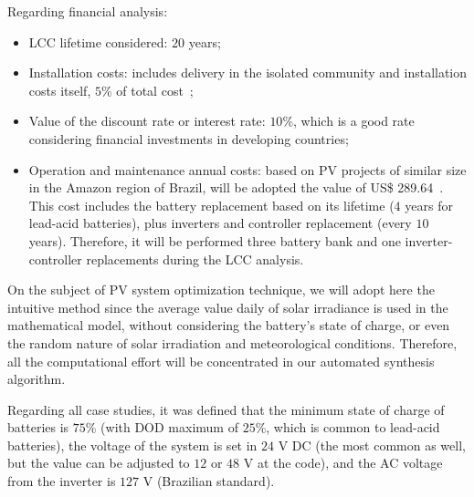\documentclass[journal]{IEEEtran}
\begin{document}
Regarding financial analysis:
\begin{itemize}
	\item LCC lifetime considered: $20$ years;
	\item Installation costs: includes delivery in the isolated community and installation costs itself, $5$\% of total cost~\cite{Agrener2013};
	\item Value of the discount rate or interest rate: $10$\%, which is a good rate considering financial investments in developing countries;
	\item Operation and maintenance annual costs: based on PV projects of similar size in the Amazon region of Brazil, will be adopted the value of US\$ 289.64~\cite{Agrener2013}. This cost includes the battery replacement based on its lifetime ($4$ years for lead-acid batteries), plus inverters and controller replacement (every $10$ years). Therefore, it will be performed three battery bank and one inverter-controller replacements during the LCC analysis.
\end{itemize}

On the subject of PV system optimization technique, we will adopt here the intuitive method 
since the average value daily of solar irradiance is used in the mathematical model, 
without considering the battery's state of charge, or even the random nature 
of solar irradiation and meteorological conditions. Therefore, all the computational 
effort will be concentrated in our automated synthesis algorithm.

Regarding all case studies, it was defined that the minimum state of charge of batteries is $75$\% (with DOD maximum of $25$\%, which is common to lead-acid batteries), the voltage of the system is set in $24$ V DC (the most common as well, but the value can be adjusted to $12$ or $48$ V at the code), and the AC voltage from the inverter is $127$ V (Brazilian standard).
\end{document}

